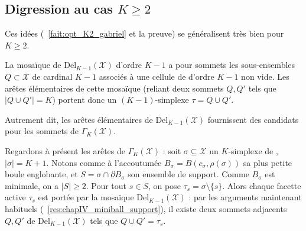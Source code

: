 


\subsection{Digression au cas $K \ge 2$}


Ces idées (\Fact~\ref{fait:opt_K2_gabriel} et la preuve) se généralisent très bien pour $K \ge 2$.

La mosaïque de  \(\mathrm{Del}_{K-1}(\mathcal X)\) d'ordre \(K-1\) a pour sommets les sous-ensembles
\(Q \subset \mathcal X\) de cardinal \(K-1\) associés à une cellule de  d'ordre \(K-1\) non vide. Les arêtes élémentaires de cette mosaïque (reliant deux sommets \(Q,Q'\) tels que
\(
        |Q \cup Q'| = K
\))
portent donc un \((K-1)\)-simplexe
\(
        \tau = Q \cup Q' .
\)

Autrement dit, les arêtes élémentaires de \(\mathrm{Del}_{K-1}(\mathcal X)\)
fournissent des candidats pour les sommets de \(\Gamma_K(\mathcal X)\).

Regardons à présent les arêtes de \(\Gamma_K(\mathcal X)\) : soit \(\sigma \subseteq \mathcal X\) un \(K\)-simplexe de , \(|\sigma|=K+1\). Notons comme à l'accoutumée
\(
        B_\sigma = B(c_\sigma,\rho(\sigma))
\)
sa plus petite boule englobante, et
\(
        S = \sigma \cap \partial B_\sigma
\)
son ensemble de support. Comme \(B_\sigma\) est minimale, on a
\(|S|\geq 2\). Pour tout \(s\in S\), on pose
\(
        \tau_s = \sigma \setminus \{s\}.
\)
Alors chaque facette active \(\tau_s\) est portée par la mosaïque
\(\mathrm{Del}_{K-1}(\mathcal X)\) : par les arguments maintenant habituels (\Res~\ref{res:chapIV_miniball_support}), il existe deux sommets adjacents
\(Q,Q'\) de \(\mathrm{Del}_{K-1}(\mathcal X)\) tels que
\(
        Q\cup Q' = \tau_s .
\) 



